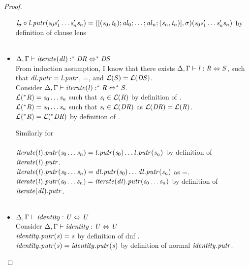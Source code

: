 \begin{lemma}
\begin{proof}
\begin{itemize}
$\mathit{l}_{\sigma} \circ \mathit{l}.\mathit{putr}(\mathit{s}_0\mathit{s}_1'\ldots\mathit{s}_n'\mathit{s}_n)=([(\mathit{s}_0,\mathit{t}_0);\mathit{al}_0;\ldots;\mathit{al}_n;(\mathit{s}_n,\mathit{t}_n)],\sigma)(\mathit{s}_0\mathit{s}_1'\ldots\mathit{s}_n'\mathit{s}_n)$ by definition of clause lens\\
\\
\item$\Delta, \Gamma \vdash \mathit{iterate(\mathit{dl})} : ^*{\mathit{DR}} \Leftrightarrow ^*{\mathit{DS}}$\\
From induction assumption, I know that there exists $\Delta, \Gamma \vdash \mathit{l} : \mathit{R} \Leftrightarrow \mathit{S}$, such that
$\mathit{dl}.\mathit{putr}=\mathit{l}.\mathit{putr}$,
\LanguageOf{\Regex}=\LanguageOf{\DNFRegex}, and
$\mathcal{L}(\mathit{S})=\mathcal{L}(\mathit{DS})$.\\
Consider $\Delta, \Gamma \vdash \mathit{iterate(\mathit{l})} : ^*{\mathit{R}} \Leftrightarrow ^*{\mathit{S}}$.\\
$\mathcal{L}(^*{\mathit{R}}) = \mathit{s}_0\ldots\mathit{s}_n$ such that $\mathit{s}_i \in \mathcal{L}(\mathit{R})$ by definition of \LanguageOf{\Star{\Regex}}.\\
$\mathcal{L}(^*{\mathit{R}}) = \mathit{s}_0\ldots\mathit{s}_n$ such that $\mathit{s}_i \in \mathcal{L}(\mathit{DR})$ as $\mathcal{L}(\mathit{DR})=\mathcal{L}(\mathit{R})$.\\
$\mathcal{L}(^*{\mathit{R}}) = \mathcal{L}(^*{\mathit{DR}})$ by definition of \LanguageOf{\Star{\DNFRegex}}.

Similarly for \LanguageOf{\Star{\RegexAlt}}\\\\
$\mathit{iterate(\mathit{l})}.\mathit{putr}(\mathit{s}_0\ldots\mathit{s}_n)=\mathit{l}.\mathit{putr}(\mathit{s}_0)\ldots\mathit{l}.\mathit{putr}(\mathit{s}_n)$ by definition of $\mathit{iterate(\mathit{l})}.\mathit{putr}$.\\
$\mathit{iterate(\mathit{l})}.\mathit{putr}(\mathit{s}_0\ldots\mathit{s}_n)=\mathit{dl}.\mathit{putr}(\mathit{s}_0)\ldots\mathit{dl}.\mathit{putr}(\mathit{s}_n)$ as \PutRightOf{\DNFLens}=\PutRightOf{\Lens}.\\
$\mathit{iterate(\mathit{l})}.\mathit{putr}(\mathit{s}_0\ldots\mathit{s}_n)=\mathit{iterate(\mathit{dl})}.\mathit{putr}(\mathit{s}_0\ldots\mathit{s}_n)$ by definition of $\mathit{iterate(\mathit{dl})}.\mathit{putr}$.\\
\\
\item$\Delta, \Gamma \vdash \mathit{identity} : \mathit{U} \Leftrightarrow \mathit{U}$\\
Consider $\Delta, \Gamma \vdash \mathit{identity} : \mathit{U} \Leftrightarrow \mathit{U}$\\
$\mathit{identity}.\mathit{putr}(\mathit{s})=\mathit{s}$ by definition of dnf \PutRightOf{\IdentityLens{}}.\\
$\mathit{identity}.\mathit{putr}(\mathit{s})=\mathit{identity}.\mathit{putr}(\mathit{s})$ by definition of normal $\mathit{identity}{}.\mathit{putr}$.
\end{itemize}
\end{proof}
\end{lemma}

